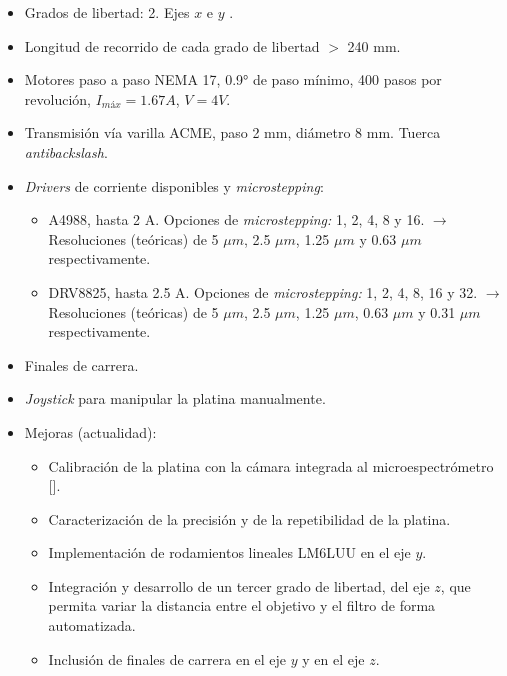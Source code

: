     \begin{itemize}
        \item Grados de libertad: 2. Ejes $\textit{x}$ e $\textit{y}$  .
        \item Longitud de recorrido de cada grado de libertad $>$ 240 mm.
        \item Motores paso a paso NEMA 17, 0.9° de paso mínimo, 400 pasos por revolución, $I_{máx} = 1.67 A$, $V = 4V$.
        \item Transmisión vía varilla ACME, paso 2 mm, diámetro 8 mm. Tuerca \textit{antibackslash}.
        \item \textit{Drivers} de corriente disponibles y \textit{microstepping}:
\begin{itemize}
\item A4988, hasta 2 A. Opciones de \textit{microstepping:} 1, 2, 4, 8 y 16. $\xrightarrow{}$ Resoluciones (teóricas) de 5 $\mu m$, 2.5 $\mu m$, 1.25 $\mu m$ y 0.63 $\mu m$ respectivamente.
\item DRV8825, hasta 2.5 A. Opciones de \textit{microstepping:} 1, 2, 4, 8, 16 y 32. $\xrightarrow{}$ Resoluciones (teóricas) de 5 $\mu m$, 2.5 $\mu m$, 1.25 $\mu m$, 0.63 $\mu m$ y 0.31 $\mu m$ respectivamente. 
\end{itemize}
\item Finales de carrera.
\item \textit{Joystick} para manipular la platina manualmente.
    \item Mejoras (actualidad):
    \begin{itemize}
 	\item Calibración de la platina con la cámara integrada al microespectrómetro [\cite{schaa}].
 	\item Caracterización de la precisión y de la repetibilidad de la platina.
        \item Implementación de rodamientos lineales LM6LUU en el eje $\textit{y}$.
        \item Integración y desarrollo de un tercer grado de libertad, del eje $\textit{z}$, que permita variar la distancia entre el objetivo y el filtro de forma automatizada.
        \item Inclusión de finales de carrera en el eje $\textit{y}$ y en el eje $\textit{z}$. 
        \end{itemize}
\end{itemize}
\newpage



